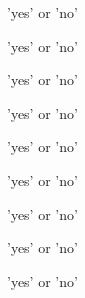  \slist
   \item \Description
   \item \Argument 'yes' or 'no'
   \item \Default
 \elist

 \slist
   \item \Description
   \item \Argument 'yes' or 'no'
   \item \Default
 \elist

 \slist
   \item \Description
   \item \Argument 'yes' or 'no'
   \item \Default
 \elist


 \slist
   \item \Description
   \item \Argument 'yes' or 'no'
   \item \Default
 \elist

 \slist
   \item \Description
   \item \Argument 'yes' or 'no'
   \item \Default
 \elist

 \slist
   \item \Description
   \item \Argument 'yes' or 'no'
   \item \Default
 \elist

 \slist
   \item \Description
   \item \Argument 'yes' or 'no'
   \item \Default
 \elist

 \slist
   \item \Description
   \item \Argument 'yes' or 'no'
   \item \Default
 \elist

\slist
  \item \Description
  \item \Argument 'yes' or 'no'
  \item \Default
\elist

